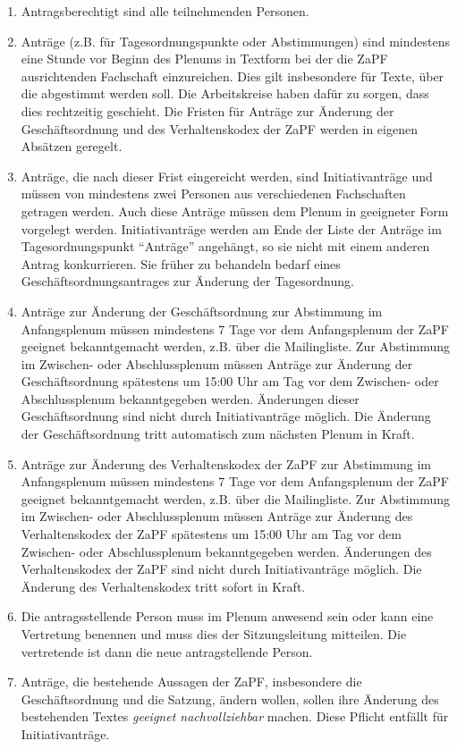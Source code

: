 \documentclass[
  a4paper,
  oneside]{scrartcl}
\providecommand{\tightlist}{%
  \setlength{\itemsep}{0pt}\setlength{\parskip}{0pt}}
\begin{document}
\begin{enumerate}
\def\labelenumi{\arabic{enumi}.}
\tightlist
\item
  Antragsberechtigt sind alle teilnehmenden Personen.
\item
  Anträge (z.B. für Tagesordnungspunkte oder Abstimmungen) sind
  mindestens eine Stunde vor Beginn des Plenums in Textform bei der die
  ZaPF ausrichtenden Fachschaft einzureichen. Dies gilt insbesondere für
  Texte, über die abgestimmt werden soll. Die Arbeitskreise haben dafür
  zu sorgen, dass dies rechtzeitig geschieht. Die Fristen für Anträge
  zur Änderung der Geschäftsordnung und des Verhaltenskodex der ZaPF
  werden in eigenen Absätzen geregelt.
\item
  Anträge, die nach dieser Frist eingereicht werden, sind
  Initiativanträge und müssen von mindestens zwei Personen aus
  verschiedenen Fachschaften getragen werden. Auch diese Anträge müssen
  dem Plenum in geeigneter Form vorgelegt werden. Initiativanträge
  werden am Ende der Liste der Anträge im Tagesordnungspunkt ``Anträge''
  angehängt, so sie nicht mit einem anderen Antrag konkurrieren. Sie
  früher zu behandeln bedarf eines Geschäftsordnungsantrages zur
  Änderung der Tagesordnung.
\item
  Anträge zur Änderung der Geschäftsordnung zur Abstimmung im
  Anfangsplenum müssen mindestens 7 Tage vor dem Anfangsplenum der ZaPF
  geeignet bekanntgemacht werden, z.B. über die Mailingliste. Zur
  Abstimmung im Zwischen- oder Abschlussplenum müssen Anträge zur
  Änderung der Geschäftsordnung spätestens um 15:00 Uhr am Tag vor dem
  Zwischen- oder Abschlussplenum bekanntgegeben werden. Änderungen
  dieser Geschäftsordnung sind nicht durch Initiativanträge möglich. Die
  Änderung der Geschäftsordnung tritt automatisch zum nächsten Plenum in
  Kraft.
\item
  Anträge zur Änderung des Verhaltenskodex der ZaPF zur Abstimmung im
  Anfangsplenum müssen mindestens 7 Tage vor dem Anfangsplenum der ZaPF
  geeignet bekanntgemacht werden, z.B. über die Mailingliste. Zur
  Abstimmung im Zwischen- oder Abschlussplenum müssen Anträge zur
  Änderung des Verhaltenskodex der ZaPF spätestens um 15:00 Uhr am Tag
  vor dem Zwischen- oder Abschlussplenum bekanntgegeben werden.
  Änderungen des Verhaltenskodex der ZaPF sind nicht durch
  Initiativanträge möglich. Die Änderung des Verhaltenskodex tritt
  sofort in Kraft.
\item
  Die antragsstellende Person muss im Plenum anwesend sein oder kann
  eine Vertretung benennen und muss dies der Sitzungsleitung mitteilen.
  Die vertretende ist dann die neue antragstellende Person.
\item
  Anträge, die bestehende Aussagen der ZaPF, insbesondere die
  Geschäftsordnung und die Satzung, ändern wollen, sollen ihre Änderung
  des bestehenden Textes \emph{geeignet nachvollziehbar} machen. Diese
  Pflicht entfällt für Initiativanträge.
\end{enumerate}
\end{document}
